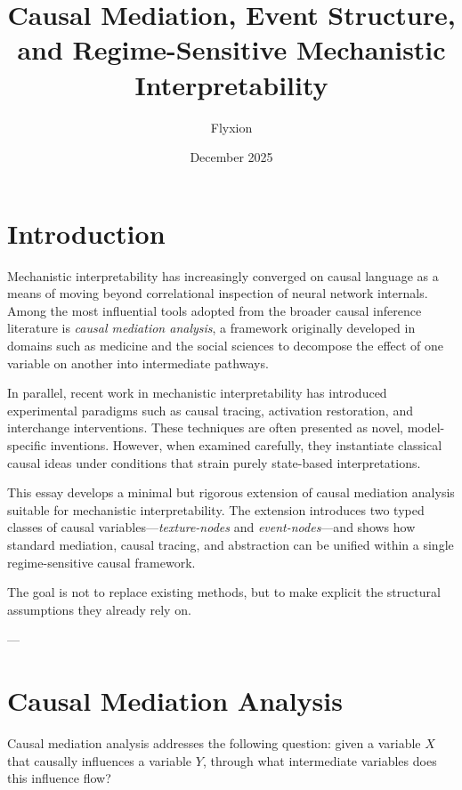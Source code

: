 \documentclass[11pt]{article}
\title{Causal Mediation, Event Structure, and Regime-Sensitive Mechanistic Interpretability}
\author{Flyxion}
\date{December 2025}
\theoremstyle{remark}
\begin{document}
\maketitle

\section{Introduction}

Mechanistic interpretability has increasingly converged on causal language as a means of moving beyond correlational inspection of neural network internals. Among the most influential tools adopted from the broader causal inference literature is \emph{causal mediation analysis}, a framework originally developed in domains such as medicine and the social sciences to decompose the effect of one variable on another into intermediate pathways.

In parallel, recent work in mechanistic interpretability has introduced experimental paradigms such as causal tracing, activation restoration, and interchange interventions. These techniques are often presented as novel, model-specific inventions. However, when examined carefully, they instantiate classical causal ideas under conditions that strain purely state-based interpretations.

This essay develops a minimal but rigorous extension of causal mediation analysis suitable for mechanistic interpretability. The extension introduces two typed classes of causal variables—\emph{texture-nodes} and \emph{event-nodes}—and shows how standard mediation, causal tracing, and abstraction can be unified within a single regime-sensitive causal framework.

The goal is not to replace existing methods, but to make explicit the structural assumptions they already rely on.

---

\section{Causal Mediation Analysis}

Causal mediation analysis addresses the following question: given a variable \(X\) that causally influences a variable \(Y\), through what intermediate variables does this influence flow?
\end{document}
